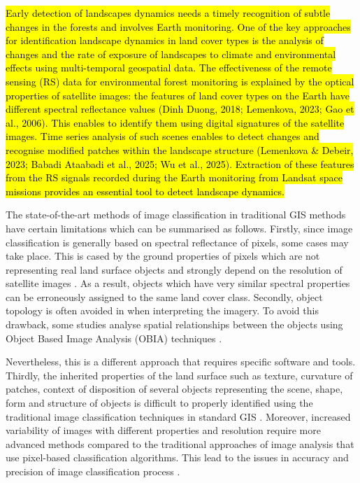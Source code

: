 \documentclass[eprint,
approc,		%
]{actapoly}
\begin{document}
\hl{Early detection of landscapes dynamics needs a timely recognition of subtle changes in the forests and involves Earth monitoring. One of the key approaches for identification landscape dynamics in land cover types is the analysis of changes and the rate of exposure of landscapes to climate and environmental effects using multi-temporal geospatial data. The effectiveness of the remote sensing (RS) data for environmental forest monitoring is explained by the optical properties of satellite images: the features of land cover types on the Earth have different spectral reflectance values (Dinh Duong, 2018; Lemenkova, 2023; Gao et al., 2006). This enables to identify them using digital signatures of the satellite images. Time series analysis of such scenes enables to detect changes and recognise modified patches within the landscape structure (Lemenkova \& Debeir, 2023; Babadi Ataabadi et al., 2025; Wu et al., 2025). Extraction of these features from the RS signals recorded during the Earth monitoring from Landsat space missions provides an essential tool to detect landscape dynamics. }

The state-of-the-art methods of image classification in traditional GIS methods have certain limitations which can be summarised as follows. Firstly, since image classification is generally based on spectral reflectance of pixels, some cases may take place. This is cased by the ground properties of pixels which are not representing real land surface objects and strongly depend on the resolution of satellite images \citep{6351712,Lemenkova202322}. As a result, objects which have very similar spectral properties can be erroneously assigned to the same land cover class. Secondly, object topology is often avoided in when interpreting the imagery. To avoid this drawback, some studies analyse spatial relationships between the objects using Object Based Image Analysis (OBIA) techniques \citep{LUCIANO2019127,PHIRI2018170,DEWALI20233109,MAO202011}. 

Nevertheless, this is a different approach that requires specific software and tools. Thirdly, the inherited properties of the land surface such as texture, curvature of patches, context of disposition of several objects representing the scene, shape, form and structure of objects is difficult to properly identified using the traditional image classification techniques in standard GIS \citep{OUSMANOU2024100239,ZHANG2023129590,BAKR2010592}. Moreover, increased variability of images with different properties and resolution require more advanced methods compared to the traditional approaches of image analysis that use pixel-based classification algorithms. This lead to the issues in accuracy and precision of image classification process \citep{Fisher,McKee}.
\end{document}
